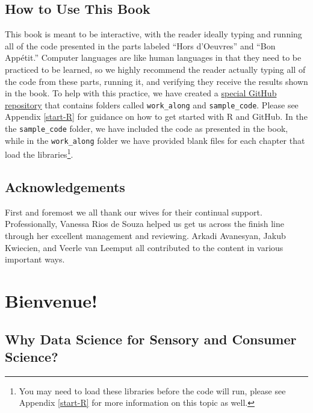 \documentclass[
]{book}
\begin{document}
\hypertarget{how-to-use-this-book}{%
\section*{How to Use This Book}\label{how-to-use-this-book}}

This book is meant to be interactive, with the reader ideally typing and running all of the code presented in the parts labeled ``Hors d'Oeuvres'' and ``Bon Appétit.'' Computer languages are like human languages in that they need to be practiced to be learned, so we highly recommend the reader actually typing all of the code from these parts, running it, and verifying they receive the results shown in the book. To help with this practice, we have created a \href{https://github.com/aigorahub/data_science_for_sensory_sample_code}{special GitHub repository} that contains folders called \texttt{work\_along} and \texttt{sample\_code}. Please see Appendix \ref{start-R} for guidance on how to get started with R and GitHub. In the the \texttt{sample\_code} folder, we have included the code as presented in the book, while in the \texttt{work\_along} folder we have provided blank files for each chapter that load the libraries\footnote{You may need to load these libraries before the code will run, please see Appendix \ref{start-R} for more information on this topic as well.}.

\hypertarget{acknowledgements}{%
\section*{Acknowledgements}\label{acknowledgements}}

First and foremost we all thank our wives for their continual support. Professionally, Vanessa Rios de Souza helped us get us across the finish line through her excellent management and reviewing. Arkadi Avanesyan, Jakub Kwiecien, and Veerle van Leemput all contributed to the content in various important ways.

\hypertarget{bienvenue}{%
\chapter{Bienvenue!}\label{bienvenue}}

\hypertarget{why-data-science-for-sensory-and-consumer-science}{%
\section*{Why Data Science for Sensory and Consumer Science?}\label{why-data-science-for-sensory-and-consumer-science}}
\end{document}
